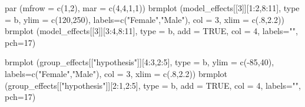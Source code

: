 \documentclass[
]{book}
\newenvironment{Shaded}{\begin{snugshade}}{\end{snugshade}}
\newcommand{\AttributeTok}[1]{\textcolor[rgb]{0.77,0.63,0.00}{#1}}
\newcommand{\ConstantTok}[1]{\textcolor[rgb]{0.00,0.00,0.00}{#1}}
\newcommand{\DecValTok}[1]{\textcolor[rgb]{0.00,0.00,0.81}{#1}}
\newcommand{\FloatTok}[1]{\textcolor[rgb]{0.00,0.00,0.81}{#1}}
\newcommand{\FunctionTok}[1]{\textcolor[rgb]{0.00,0.00,0.00}{#1}}
\newcommand{\NormalTok}[1]{#1}
\newcommand{\SpecialCharTok}[1]{\textcolor[rgb]{0.00,0.00,0.00}{#1}}
\newcommand{\StringTok}[1]{\textcolor[rgb]{0.31,0.60,0.02}{#1}}
\begin{document}
\begin{Shaded}
\begin{Highlighting}[]
\FunctionTok{par}\NormalTok{ (}\AttributeTok{mfrow =} \FunctionTok{c}\NormalTok{(}\DecValTok{1}\NormalTok{,}\DecValTok{2}\NormalTok{), }\AttributeTok{mar =} \FunctionTok{c}\NormalTok{(}\DecValTok{4}\NormalTok{,}\DecValTok{4}\NormalTok{,}\DecValTok{1}\NormalTok{,}\DecValTok{1}\NormalTok{))}
\FunctionTok{brmplot}\NormalTok{ (model\_effects[[}\DecValTok{3}\NormalTok{]][}\DecValTok{1}\SpecialCharTok{:}\DecValTok{2}\NormalTok{,}\DecValTok{8}\SpecialCharTok{:}\DecValTok{11}\NormalTok{], }\AttributeTok{type =} \StringTok{\textquotesingle{}b\textquotesingle{}}\NormalTok{, }\AttributeTok{ylim =} \FunctionTok{c}\NormalTok{(}\DecValTok{120}\NormalTok{,}\DecValTok{250}\NormalTok{), }
         \AttributeTok{labels=}\FunctionTok{c}\NormalTok{(}\StringTok{"Female"}\NormalTok{,}\StringTok{"Male"}\NormalTok{), }\AttributeTok{col =} \DecValTok{3}\NormalTok{, }\AttributeTok{xlim =} \FunctionTok{c}\NormalTok{(.}\DecValTok{8}\NormalTok{,}\FloatTok{2.2}\NormalTok{))}
\FunctionTok{brmplot}\NormalTok{ (model\_effects[[}\DecValTok{3}\NormalTok{]][}\DecValTok{3}\SpecialCharTok{:}\DecValTok{4}\NormalTok{,}\DecValTok{8}\SpecialCharTok{:}\DecValTok{11}\NormalTok{], }\AttributeTok{type =} \StringTok{\textquotesingle{}b\textquotesingle{}}\NormalTok{, }\AttributeTok{add =} \ConstantTok{TRUE}\NormalTok{, }\AttributeTok{col =} \DecValTok{4}\NormalTok{,}
         \AttributeTok{labels=}\StringTok{""}\NormalTok{, }\AttributeTok{pch=}\DecValTok{17}\NormalTok{)}

\FunctionTok{brmplot}\NormalTok{ (group\_effects[[}\StringTok{"hypothesis"}\NormalTok{]][}\DecValTok{4}\SpecialCharTok{:}\DecValTok{3}\NormalTok{,}\DecValTok{2}\SpecialCharTok{:}\DecValTok{5}\NormalTok{], }\AttributeTok{type =} \StringTok{\textquotesingle{}b\textquotesingle{}}\NormalTok{, }\AttributeTok{ylim =} \FunctionTok{c}\NormalTok{(}\SpecialCharTok{{-}}\DecValTok{85}\NormalTok{,}\DecValTok{40}\NormalTok{),  }
         \AttributeTok{labels=}\FunctionTok{c}\NormalTok{(}\StringTok{"Female"}\NormalTok{,}\StringTok{"Male"}\NormalTok{), }\AttributeTok{col =} \DecValTok{3}\NormalTok{, }\AttributeTok{xlim =} \FunctionTok{c}\NormalTok{(.}\DecValTok{8}\NormalTok{,}\FloatTok{2.2}\NormalTok{))}
\FunctionTok{brmplot}\NormalTok{ (group\_effects[[}\StringTok{"hypothesis"}\NormalTok{]][}\DecValTok{2}\SpecialCharTok{:}\DecValTok{1}\NormalTok{,}\DecValTok{2}\SpecialCharTok{:}\DecValTok{5}\NormalTok{], }\AttributeTok{type =} \StringTok{\textquotesingle{}b\textquotesingle{}}\NormalTok{, }\AttributeTok{add =} \ConstantTok{TRUE}\NormalTok{, }\AttributeTok{col =} \DecValTok{4}\NormalTok{,}
         \AttributeTok{labels=}\StringTok{""}\NormalTok{, }\AttributeTok{pch=}\DecValTok{17}\NormalTok{)}
\end{Highlighting}
\end{Shaded}
\end{document}
